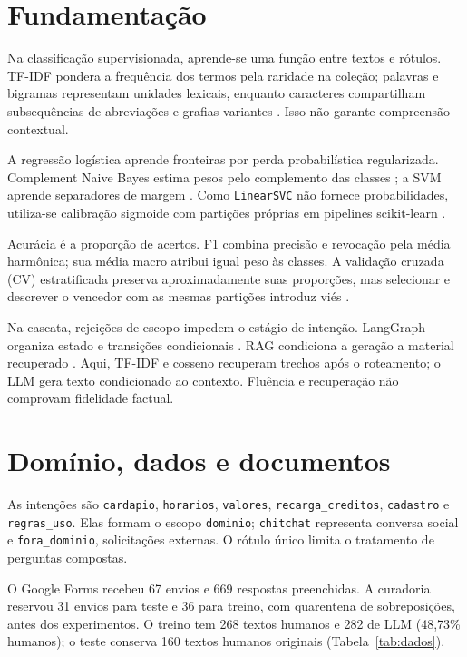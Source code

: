 \documentclass[12pt]{article}
\begin{document}
\section{Fundamentação}
Na classificação supervisionada, aprende-se uma função entre textos e rótulos.
TF-IDF pondera a frequência dos termos pela raridade na coleção; palavras e
bigramas representam unidades lexicais, enquanto caracteres compartilham
subsequências de abreviações e grafias variantes \cite{manning2008}.
Isso não garante compreensão contextual.

A regressão logística aprende fronteiras por perda probabilística regularizada.
Complement Naive Bayes estima pesos pelo complemento das classes
\cite{rennie2003}; a SVM aprende separadores de margem \cite{cortes1995}.
Como \texttt{LinearSVC} não fornece probabilidades, utiliza-se calibração
sigmoide com partições próprias \cite{sklearncalibration} em pipelines
scikit-learn \cite{pedregosa2011}.

Acurácia é a proporção de acertos. F1 combina precisão e revocação pela média
harmônica; sua média macro atribui igual peso às classes. A validação cruzada
(CV) estratificada preserva aproximadamente suas proporções, mas selecionar
e descrever o vencedor com as mesmas partições introduz viés \cite{varma2006}.

Na cascata, rejeições de escopo impedem o estágio de intenção.
LangGraph organiza estado e transições condicionais \cite{langgraph}.
RAG condiciona a geração a material recuperado \cite{lewis2020}.
Aqui, TF-IDF e cosseno recuperam trechos após o roteamento; o LLM gera texto
condicionado ao contexto. Fluência e recuperação não comprovam fidelidade factual.

\section{Domínio, dados e documentos}
As intenções são \texttt{cardapio}, \texttt{horarios}, \texttt{valores},
\texttt{recarga\_creditos}, \texttt{cadastro} e \texttt{regras\_uso}.
Elas formam o escopo \texttt{dominio}; \texttt{chitchat} representa conversa
social e \texttt{fora\_dominio}, solicitações externas. O rótulo único limita
o tratamento de perguntas compostas.

O Google Forms recebeu 67 envios e 669 respostas preenchidas. A curadoria
reservou 31 envios para teste e 36 para treino, com quarentena de sobreposições,
antes dos experimentos. O treino tem 268 textos humanos e 282 de LLM (48,73\%
humanos); o teste conserva 160 textos humanos originais (Tabela~\ref{tab:dados}).

\end{document}
